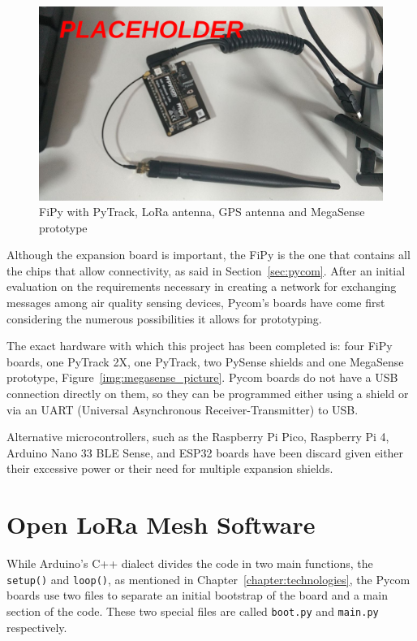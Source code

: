 		\begin{figure}[h]
			\centering
			\includegraphics[width=\textwidth]{resources/img/chap5/mesh-irl-picture}
			\caption{FiPy with PyTrack, LoRa antenna, GPS antenna and MegaSense prototype}
			\label{img:irl_picture_1}
		\end{figure}
		
		Although the expansion board is important, the FiPy is the one that contains all the chips that allow connectivity, as said in Section~\ref{sec:pycom}.
		After an initial evaluation on the requirements necessary in creating a network for exchanging messages among air quality sensing devices, Pycom's boards have come first considering the numerous possibilities it allows for prototyping.
		
		The exact hardware with which this project has been completed is: four FiPy boards, one PyTrack 2X, one PyTrack, two PySense shields and one MegaSense prototype, Figure~\ref{img:megasense_picture}.
		Pycom boards do not have a USB connection directly on them, so they can be programmed either using a shield or via an UART (Universal Asynchronous Receiver-Transmitter) to USB.
		
		Alternative microcontrollers, such as the Raspberry Pi Pico, Raspberry Pi 4, Arduino Nano 33 BLE Sense, and ESP32 boards have been discard given either their excessive power or their need for multiple expansion shields.
				
	\section{Open LoRa Mesh Software}\label{sec:software_solution}
	
		While Arduino's C++ dialect divides the code in two main functions, the \texttt{setup()} and \texttt{loop()}, as mentioned in Chapter~\ref{chapter:technologies}, the Pycom boards use two files to separate an initial bootstrap of the board and a main section of the code.
		These two special files are called \texttt{boot.py} and \texttt{main.py} respectively.
		

